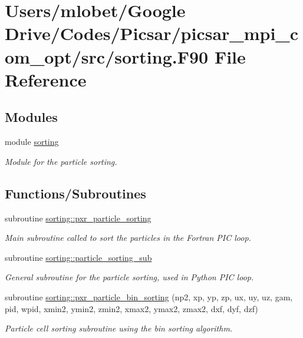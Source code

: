 \hypertarget{sorting_8_f90}{}\section{Users/mlobet/\+Google Drive/\+Codes/\+Picsar/picsar\+\_\+mpi\+\_\+com\+\_\+opt/src/sorting.F90 File Reference}
\label{sorting_8_f90}
\subsection*{Modules}
\begin{DoxyCompactItemize}
\item 
module \hyperlink{namespacesorting}{sorting}
\begin{DoxyCompactList}\small\item\em Module for the particle sorting. \end{DoxyCompactList}\end{DoxyCompactItemize}
\subsection*{Functions/\+Subroutines}
\begin{DoxyCompactItemize}
\item 
subroutine \hyperlink{namespacesorting_a87a0a7dcccbf50dc52ec0f6d03892df0}{sorting\+::pxr\+\_\+particle\+\_\+sorting}
\begin{DoxyCompactList}\small\item\em Main subroutine called to sort the particles in the Fortran P\+IC loop. \end{DoxyCompactList}\item 
subroutine \hyperlink{namespacesorting_a1aa6cb1a11b013d93cabdee6bf4910d9}{sorting\+::particle\+\_\+sorting\+\_\+sub}
\begin{DoxyCompactList}\small\item\em General subroutine for the particle sorting, used in Python P\+IC loop. \end{DoxyCompactList}\item 
subroutine \hyperlink{namespacesorting_ab1b6f85a226345de94537dc63205a182}{sorting\+::pxr\+\_\+particle\+\_\+bin\+\_\+sorting} (np2, xp, yp, zp, ux, uy, uz, gam, pid, wpid,                                       xmin2, ymin2, zmin2, xmax2, ymax2, zmax2, dxf, dyf, dzf)
\begin{DoxyCompactList}\small\item\em Particle cell sorting subroutine using the bin sorting algorithm. \end{DoxyCompactList}\end{DoxyCompactItemize}

